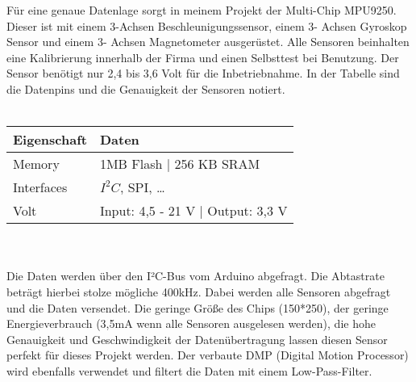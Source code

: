 Für eine genaue Datenlage sorgt in meinem Projekt der Multi-Chip MPU9250. Dieser ist mit 
einem 3-Achsen Beschleunigungssensor, einem 3- Achsen Gyroskop Sensor und einem 3-
Achsen Magnetometer ausgerüstet. Alle Sensoren beinhalten eine Kalibrierung innerhalb der 
Firma und einen Selbsttest bei Benutzung. Der Sensor benötigt nur 2,4 bis 3,6 Volt für die 
Inbetriebnahme. In der Tabelle sind die Datenpins und die Genauigkeit der Sensoren notiert.\\
\\
\begin{tabularx}{0.8\textwidth}{l|X}
Eigenschaft & Daten \\
\hline
Memory & 1MB Flash | 256 KB SRAM \\ 

Interfaces & $I^2C$, SPI, \dots \\

Volt & Input: 4,5 - 21 V | Output: 3,3 V\\
\end{tabularx}
\\
\\
Die Daten werden über den I²C-Bus vom Arduino abgefragt. Die Abtastrate beträgt hierbei 
stolze mögliche 400kHz. Dabei werden alle Sensoren abgefragt und die Daten versendet.
Die geringe Größe des Chips (150*250), der geringe Energieverbrauch (3,5mA wenn 
alle Sensoren ausgelesen werden), die hohe Genauigkeit und Geschwindigkeit der 
Datenübertragung lassen diesen Sensor perfekt für dieses Projekt werden. Der verbaute
DMP (Digital Motion Processor) wird ebenfalls verwendet und filtert die Daten mit einem
Low-Pass-Filter.